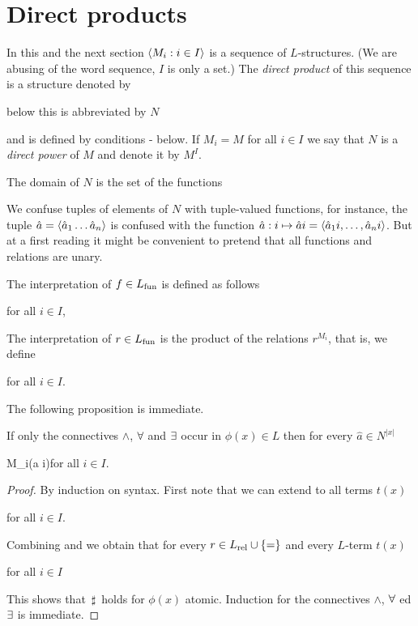 \documentclass[creche.tex]{subfiles}
\begin{document}
\section{Direct products}
\label{prodottidiretti}

In this and the next section $\langle M_i:i\in I\rangle$ is a sequence of $L$-structures. (We are abusing of the word sequence, $I$ is only a set.) The \emph{direct product\/} of this sequence is a structure denoted by

\hfill below this is abbreviated by  \emph{$N$\/}

and is defined by conditions - below. If $M_i=M$ for all $i\in I$ we say that $N$ is a \emph{direct power\/} of $M$ and denote it by \emph{$M^I$}.

The domain of $N$ is the set of the functions

\smallskip


We confuse tuples of elements of $N$ with tuple-valued functions, for instance, the tuple $\hat a=\langle\hat a_1\dots\hat a_n\rangle$ is confused with the function $\hat a:i\mapsto\hat ai=\langle\hat a_1i,\dots,\hat a_ni\rangle$. But at a first reading it might be convenient to pretend that all functions and relations are unary.

The interpretation of $f\in L_{\rm fun}$ is defined as follows

\hfill  for all $i\in I$,

The interpretation of $r\in L_{\rm fun}$ is the product of the relations $r^{M_i}$, that is, we define

\hfill  for all $i\in I$.


The following proposition is immediate.

\begin{proposition}\label{proposizioneprodottidiretti}
If only the connectives $\wedge$, $\forall$ and $\exists$ occur in $\phi(x)\in L$ then for every $\hat a\in N^{|x|}$

{\IFF}
{M_i\models\phi(\hat a i)}\hfill for all $i\in I$.

\end{proposition}

\begin{proof}
By induction on syntax. First note that we can extend  to all terms $t(x)$

\hfill  for all $i\in I$. 

Combining  and  we obtain that for every $r\in L_{\rm rel}\cup\{=\}$ and every $L$-term $t(x)$

\hfill  for all $i\in I$

This shows that $\,\sharp\,$ holds for $\phi(x)$ atomic. Induction for the connectives $\wedge$, $\forall$ ed $\exists$ is immediate.
\end{proof}
\end{document}
